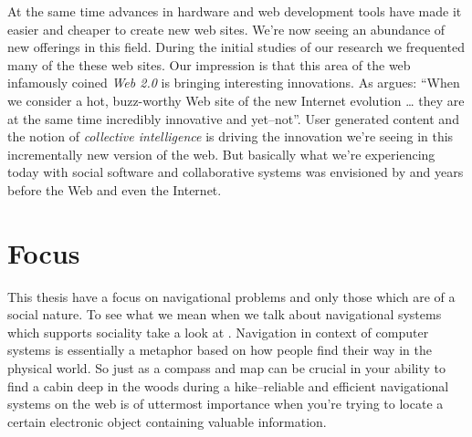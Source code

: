 At the same time advances in hardware and web development tools have made it
easier and cheaper to create new web sites. We're now seeing an
abundance of new offerings in this field.
During the initial studies of our research we frequented
many of the these web sites. Our impression is that
this area of the web infamously coined \emph{Web 2.0}%
is bringing interesting innovations. As \citet[p.~18]{weiss05} argues:
``When we consider a hot, buzz-worthy Web site of the new Internet evolution
\ldots
they are at the same time incredibly innovative and yet--not''.
User generated content and the notion of \emph{collective intelligence} is
driving the innovation we're seeing in this incrementally new version of the
web. But basically what we're experiencing today with social software and
collaborative systems was envisioned by \citet{bush45} and
\citet{licklider68} years before the Web and even the Internet.

\section{Focus}

This thesis have a focus on navigational problems and only those
which are of a social nature. To see what we mean when we talk about
navigational systems which supports sociality take a look at
.
Navigation in context of computer systems is
essentially a metaphor based on how people find their way in the physical
world. So just as a compass and map can be crucial in your ability to find a
cabin deep in the woods during a hike--reliable and efficient navigational
systems on the web is of uttermost importance when you're trying to locate a
certain electronic object containing valuable information.


